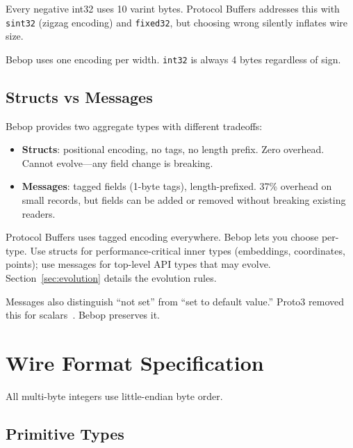 \documentclass[11pt,onecolumn]{article}
\begin{document}
Every negative int32 uses 10 varint bytes. Protocol Buffers addresses this with \texttt{sint32} (zigzag encoding) and \texttt{fixed32}, but choosing wrong silently inflates wire size.

Bebop uses one encoding per width. \texttt{int32} is always 4 bytes regardless of sign.

\subsection{Structs vs Messages}

Bebop provides two aggregate types with different tradeoffs:

\begin{itemize}[leftmargin=2em,itemsep=4pt,topsep=6pt]
\item \textbf{Structs}: positional encoding, no tags, no length prefix. Zero overhead. Cannot evolve---any field change is breaking.
\item \textbf{Messages}: tagged fields (1-byte tags), length-prefixed. 37\% overhead on small records, but fields can be added or removed without breaking existing readers.
\end{itemize}

Protocol Buffers uses tagged encoding everywhere. Bebop lets you choose per-type. Use structs for performance-critical inner types (embeddings, coordinates, points); use messages for top-level API types that may evolve. Section~\ref{sec:evolution} details the evolution rules.

Messages also distinguish ``not set'' from ``set to default value.'' Proto3 removed this for scalars~\cite{proto3-presence}. Bebop preserves it.


\newpage
\section{Wire Format Specification}

All multi-byte integers use little-endian byte order.

\subsection{Primitive Types}
\end{document}
